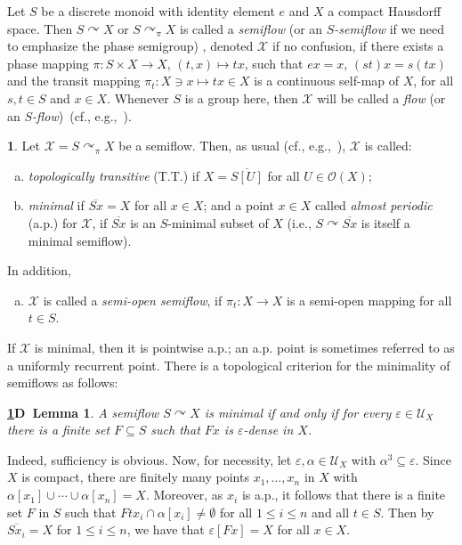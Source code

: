 \documentclass[12pt,final,3p,times]{elsarticle}
\newtheorem*{1.3.1D}{\ref{1.3.1}D~Lemma}
\theoremstyle{definition}
\newtheorem{sse}[sthm]{}
\numberwithin{equation}{section}
\begin{document}
Let $S$ be a discrete monoid with identity element $e$ and $X$ a compact Hausdorff space. Then $S\curvearrowright X$ or $S\curvearrowright_\pi X$ is called a \textit{semiflow} (or an \textit{$S$-semiflow} if we need to emphasize the phase semigroup) \cite{EEN, AD}, denoted $\mathscr{X}$ if no confusion, if there exists a phase mapping $\pi\colon S\times X\rightarrow X$, $(t,x)\mapsto tx$, such that $ex=x$, $(st)x=s(tx)$ and the transit mapping $\pi_t\colon X\ni x\mapsto tx\in X$ is a continuous self-map of $X$, for all $s,t\in S$ and $x\in X$. Whenever $S$ is a group here, then $\mathscr{X}$ will be called a \textit{flow} (or an \textit{$S$-flow})~(cf., e.g.,~\cite{E69, B79, G76, Wo, A88, DeV}).
\begin{sse}\label{1.3.1}
Let $\mathscr{X}=S\curvearrowright_\pi X$ be a semiflow. Then, as usual (cf., e.g.,~\cite{B79, Wo, DeV, AD}), $\mathscr{X}$ is called: 
\begin{enumerate}[a.]
\item[\textbf{a.}] \textit{topologically transitive} (T.T.) if $X=\overline{S[U]}$ for all $U\in\mathscr{O}(X)$; 

\item[\textbf{b.}] \textit{minimal} if $\overline{Sx}=X$ for all $x\in X$; and a point $x\in X$ called \textit{almost periodic} (a.p.) for $\mathscr{X}$, if $\overline{Sx}$ is an $S$-minimal subset of $X$ (i.e., $S\curvearrowright\overline{Sx}$ is itself a minimal semiflow).
\end{enumerate}
In addition,
\begin{enumerate}[a.]
\item[\textbf{c.}] $\mathscr{X}$ is called a \textit{semi-open semiflow}, if $\pi_t\colon X\rightarrow X$ is a semi-open mapping for all $t\in S$. 
\end{enumerate}
\end{sse}

If $\mathscr{X}$ is minimal, then it is pointwise a.p.; an a.p. point is sometimes referred to as a uniformly recurrent point.  There is a topological criterion for the minimality of semiflows as follows:

\begin{1.3.1D}
A semiflow $S\curvearrowright X$ is minimal if and only if for every $\varepsilon\in\mathscr{U}_X$ there is a finite set $F\subseteq S$ such that $Fx$ is $\varepsilon$-dense in $X$.
\end{1.3.1D}

\noindent Indeed, sufficiency is obvious. Now, for necessity, let $\varepsilon, \alpha\in\mathscr{U}_X$ with $\alpha^3\subseteq\varepsilon$. Since $X$ is compact, there are finitely many points $x_1, \dotsc, x_n$ in $X$ with $\alpha[x_1]\cup\dotsm\cup\alpha[x_n]=X$. Moreover, as $x_i$ is a.p., it follows that there is a finite set $F$ in $S$ such that $Ftx_i\cap\alpha[x_i]\not=\emptyset$ for all $1\le i\le n$ and all $t\in S$. Then by $\overline{Sx_i}=X$ for $1\le i\le n$, we have that $\varepsilon[Fx]=X$ for all $x\in X$.
\end{document}

